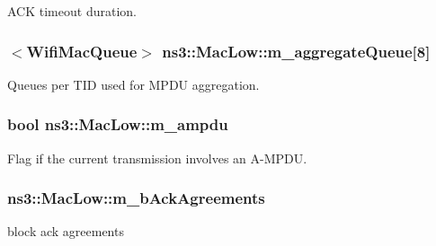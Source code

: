 A\+CK timeout duration. 

\subsubsection[{\texorpdfstring{m\+\_\+aggregate\+Queue}{m_aggregateQueue}}]{$<${\bf Wifi\+Mac\+Queue}$>$ ns3\+::\+Mac\+Low\+::m\+\_\+aggregate\+Queue\mbox{[}8\mbox{]}\hspace{0.3cm}{\ttfamily [private]}}\hypertarget{classns3_1_1MacLow_a50ea30f5dff00a3ef2683b9275717c6f}{}\label{classns3_1_1MacLow_a50ea30f5dff00a3ef2683b9275717c6f}


Queues per T\+ID used for M\+P\+DU aggregation. 

\subsubsection[{\texorpdfstring{m\+\_\+ampdu}{m_ampdu}}]{\setlength{\rightskip}{0pt plus 5cm}bool ns3\+::\+Mac\+Low\+::m\+\_\+ampdu\hspace{0.3cm}{\ttfamily [private]}}\hypertarget{classns3_1_1MacLow_a59c50cdd4a959f8dfc629d6df2e3cc00}{}\label{classns3_1_1MacLow_a59c50cdd4a959f8dfc629d6df2e3cc00}


Flag if the current transmission involves an A-\/\+M\+P\+DU. 

\subsubsection[{\texorpdfstring{m\+\_\+b\+Ack\+Agreements}{m_bAckAgreements}}]{ ns3\+::\+Mac\+Low\+::m\+\_\+b\+Ack\+Agreements\hspace{0.3cm}{\ttfamily [private]}}\hypertarget{classns3_1_1MacLow_a53482df1a7e6f136cfa8ce50fa10adc2}{}\label{classns3_1_1MacLow_a53482df1a7e6f136cfa8ce50fa10adc2}


block ack agreements 

